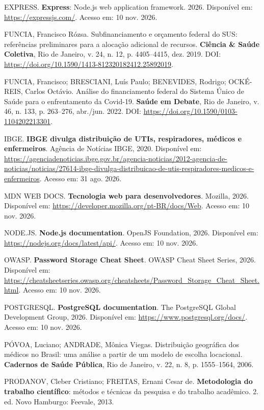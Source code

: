 \documentclass[12pt,a4paper]{article}
\begin{document}
EXPRESS. \textbf{Express}: Node.js web application framework. 2026. Disponível em: \url{https://expressjs.com/}. Acesso em: 10 nov. 2026.

FUNCIA, Francisco Rózsa. Subfinanciamento e orçamento federal do SUS: referências preliminares para a alocação adicional de recursos. \textbf{Ciência \& Saúde Coletiva}, Rio de Janeiro, v. 24, n. 12, p. 4405--4415, dez. 2019. DOI: \url{https://doi.org/10.1590/1413-812320182412.25892019}.

FUNCIA, Francisco; BRESCIANI, Luís Paulo; BENEVIDES, Rodrigo; OCKÉ-REIS, Carlos Octávio. Análise do financiamento federal do Sistema Único de Saúde para o enfrentamento da Covid-19. \textbf{Saúde em Debate}, Rio de Janeiro, v. 46, n. 133, p. 263--276, abr./jun. 2022. DOI: \url{https://doi.org/10.1590/0103-1104202213301}.

IBGE. \textbf{IBGE divulga distribuição de UTIs, respiradores, médicos e enfermeiros}. Agência de Notícias IBGE, 2020. Disponível em: \url{https://agenciadenoticias.ibge.gov.br/agencia-noticias/2012-agencia-de-noticias/noticias/27614-ibge-divulga-distribuicao-de-utis-respiradores-medicos-e-enfermeiros}. Acesso em: 31 ago. 2026.

MDN WEB DOCS. \textbf{Tecnologia web para desenvolvedores}. Mozilla, 2026. Disponível em: \url{https://developer.mozilla.org/pt-BR/docs/Web}. Acesso em: 10 nov. 2026.

NODE.JS. \textbf{Node.js documentation}. OpenJS Foundation, 2026. Disponível em: \url{https://nodejs.org/docs/latest/api/}. Acesso em: 10 nov. 2026.

OWASP. \textbf{Password Storage Cheat Sheet}. OWASP Cheat Sheet Series, 2026. Disponível em: \url{https://cheatsheetseries.owasp.org/cheatsheets/Password_Storage_Cheat_Sheet.html}. Acesso em: 10 nov. 2026.

POSTGRESQL. \textbf{PostgreSQL documentation}. The PostgreSQL Global Development Group, 2026. Disponível em: \url{https://www.postgresql.org/docs/}. Acesso em: 10 nov. 2026.

PÓVOA, Luciano; ANDRADE, Mônica Viegas. Distribuição geográfica dos médicos no Brasil: uma análise a partir de um modelo de escolha locacional. \textbf{Cadernos de Saúde Pública}, Rio de Janeiro, v. 22, n. 8, p. 1555--1564, 2006.

PRODANOV, Cleber Cristiano; FREITAS, Ernani Cesar de. \textbf{Metodologia do trabalho científico}: métodos e técnicas da pesquisa e do trabalho acadêmico. 2. ed. Novo Hamburgo: Feevale, 2013.
\end{document}
